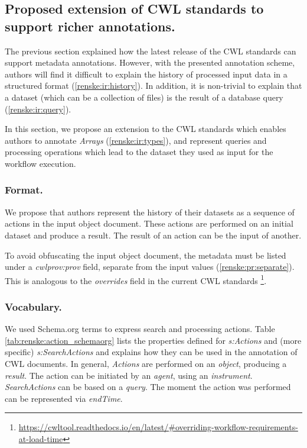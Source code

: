 




\subsection{Proposed extension of CWL standards to support richer annotations.}
\label{sec:renske:annot_new_cwl}

The previous section explained how the latest release of the CWL standards can support metadata annotations. However, with the presented annotation scheme, authors will find it difficult to explain the history of processed input data in a structured format (\ref{renske:ir:history}). In addition, it is non-trivial to explain that a dataset (which can be a collection of files) is the result of a database query (\ref{renske:ir:query}).

In this section, we propose an extension to the CWL standards which enables authors to annotate \emph{Arrays} (\ref{renske:ir:types}), and represent queries and processing operations which lead to the dataset they used as input for the workflow execution.

\subsubsection{Format.} 

We propose that authors represent the history of their datasets as a sequence of actions in the input object document. These actions are performed on an initial dataset and produce a result. The result of an action can be the input of another.

To avoid obfuscating the input object document, the metadata must be listed under a \emph{cwlprov:prov} field, separate from the input values (\ref{renske:pr:separate}). This is analogous to the \emph{overrides} field in the current CWL standards
\footnote{\RaggedRight\url{https://cwltool.readthedocs.io/en/latest/\#overriding-workflow-requirements-at-load-time}}.

\subsubsection{Vocabulary.}

We used Schema.org terms to express search and processing actions. Table \ref{tab:renske:action_schemaorg} lists the properties defined for \emph{s:Actions} and (more specific) \emph{s:SearchActions} and explains how they can be used in the annotation of CWL documents. In general, \emph{Actions} are performed on an \emph{object}, producing a \emph{result}. The action can be initiated by an \emph{agent}, using an \emph{instrument}. \emph{SearchActions} can be based on a \emph{query}. The moment the action was performed can be represented via \emph{endTime}.

